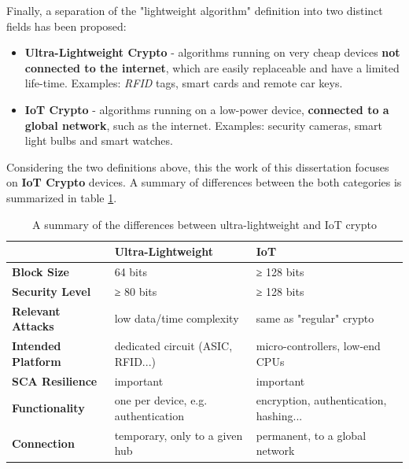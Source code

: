 \documentclass{llncs}
\begin{document}
{Finally, a separation of the "lightweight algorithm" definition into two distinct fields has been proposed:

\begin{itemize}
  \item \textbf{Ultra-Lightweight Crypto} - algorithms running on very cheap
  devices \textbf{not connected to the internet}, which are easily replaceable
  and have a limited life-time. Examples: \textit{RFID} tags, smart cards and remote car keys.
  \item \textbf{IoT Crypto} - algorithms running on a low-power device,
  \textbf{connected to a global network}, such as the internet. Examples: security cameras, smart light bulbs and smart watches.
\end{itemize}

Considering the two definitions above, this the work of this dissertation focuses on \textbf{IoT Crypto}
devices. A summary of differences between the both categories is summarized in
table \ref{ul-iot}.

\begin{table}[]
\centering
\caption{A summary of the differences between ultra-lightweight and IoT crypto}
\label{ul-iot}
\begin{tabular}{@{}lll@{}}
\toprule
                           & \textbf{Ultra-Lightweight}          & \textbf{IoT}                           \\ \midrule
\textbf{Block Size}        & 64 bits                             & ≥ 128 bits                             \\
\textbf{Security Level}    & ≥ 80 bits                           & ≥ 128 bits                             \\
\textbf{Relevant Attacks}  & low data/time complexity            & same as "regular" crypto               \\
\textbf{Intended Platform} & dedicated circuit (ASIC, RFID...)   & micro-controllers, low-end CPUs        \\
\textbf{SCA Resilience}    & important                           & important                              \\
\textbf{Functionality}     & one per device, e.g. authentication & encryption, authentication, hashing... \\
\textbf{Connection}        & temporary, only to a given hub      & permanent, to a global network         \\ \bottomrule
\end{tabular}
\end{table}

}
\end{document}
